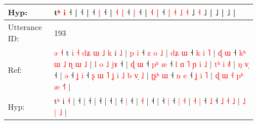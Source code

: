 \documentclass[10pt]{article}
\DeclareRobustCommand{\hl}[1]{{\textcolor{red}{#1}}}
\begin{document}
\begin{longtable}{ll}
 \\
Hyp: & \hl{}\hl{}\hl{}\hl{}\hl{}\hl{}t\hl{ʰ} \hl{i} ˧\hl{}\hl{}\hl{}\hl{}\hl{}\hl{}\hl{}\hl{}\hl{}\hl{}\hl{}\hl{}\hl{}\hl{}\hl{}\hl{}\hl{} |\hl{}\hl{}\hl{}\hl{} ˧\hl{}\hl{}\hl{}\hl{}\hl{}\hl{}\hl{}\hl{}\hl{}\hl{}\hl{}\hl{}\hl{}\hl{}\hl{}\hl{}\hl{}\hl{}\hl{}\hl{}\hl{}\hl{}\hl{}\hl{} |\hl{}\hl{} ˧\hl{}\hl{} \hl{|} ˧\hl{}\hl{}\hl{}\hl{}\hl{}\hl{} | \hl{}\hl{˧} \hl{|} ˧\hl{}\hl{} \hl{|} ˧ | \hl{}\hl{˧} \hl{|} ˧\hl{}\hl{} \hl{}\hl{}\hl{|} \hl{˧} \hl{}\hl{}\hl{˩} \hl{˧} ˩\hl{}\hl{}\hl{} \hl{˧} ˩ |\hl{}\hl{}\hl{}\hl{}\hl{} ˩\hl{} |\hl{}\hl{}\hl{}\hl{}\hl{}\hl{}\hl{}\hl{}\hl{}\hl{}\hl{}\hl{}\hl{}\hl{}\hl{}\hl{}\hl{}\hl{}\hl{}\hl{}\hl{}\hl{}\hl{}\hl{} ˩ |
 \\
\midrule
Utterance ID: & 193 \\
Ref: & \hl{ə}\hl{ }\hl{˧}\hl{ }t\hl{ }\hl{i}\hl{ }\hl{˧}\hl{ }\hl{d}\hl{ʑ}\hl{ }\hl{ɯ}\hl{ }\hl{˩}\hl{ }\hl{k} i \hl{˩} |\hl{ }\hl{p}\hl{ }\hl{i} ˧\hl{ }\hl{z}\hl{ }\hl{o}\hl{ }\hl{˩} |\hl{ }\hl{d}\hl{ʑ}\hl{ }\hl{ɯ} ˧\hl{ }\hl{k}\hl{ }\hl{i}\hl{ }\hl{˥} |\hl{ }\hl{ɖ}\hl{ }\hl{ɯ} ˧\hl{ }\hl{k}\hl{ʰ}\hl{ }\hl{ɯ}\hl{ }\hl{˩}\hl{ }\hl{ɳ}\hl{ }\hl{ɯ}\hl{ }\hl{˩} |\hl{ }\hl{l}\hl{ }\hl{o}\hl{ }\hl{˩}\hl{ }\hl{j}\hl{ɤ} ˧ |\hl{ }\hl{ɖ}\hl{ }\hl{ɯ} ˧\hl{ }\hl{p}\hl{ʰ} \hl{æ} ˧\hl{ }\hl{l}\hl{ }\hl{ɑ}\hl{ }\hl{˥}\hl{ }\hl{ɲ}\hl{ }\hl{i}\hl{ }\hl{˩} |\hl{ }\hl{t}\hl{ʰ}\hl{ }\hl{i} \hl{˩}\hl{˥} |\hl{ }\hl{ŋ}\hl{ }\hl{v}\hl{̩} ˧ |\hl{ }\hl{ə} ˧\hl{ }\hl{ʝ} \hl{i} ˧\hl{ }\hl{ʂ}\hl{ }\hl{ɯ}\hl{ }\hl{˥}\hl{ }\hl{ʝ}\hl{ }\hl{i}\hl{ }\hl{˩}\hl{ }\hl{b} \hl{v}\hl{̩} \hl{˩} | \hl{ʈ}\hl{ʂ}\hl{ʰ} \hl{ɯ} ˧\hl{ }\hl{n} \hl{e} ˧ \hl{ʝ} \hl{i} \hl{˥} |\hl{ }\hl{ɖ}\hl{ }\hl{ɯ}\hl{ }\hl{˧} \hl{p}\hl{ʰ} \hl{æ} \hl{˧}\hl{˥} |
 \\
Hyp: & \hl{}\hl{}\hl{}\hl{}t\hl{}\hl{}\hl{}\hl{}\hl{}\hl{}\hl{}\hl{}\hl{}\hl{}\hl{}\hl{}\hl{ʰ} i \hl{˧} |\hl{}\hl{}\hl{}\hl{} ˧\hl{}\hl{}\hl{}\hl{}\hl{}\hl{} |\hl{}\hl{}\hl{}\hl{}\hl{} ˧\hl{}\hl{}\hl{}\hl{}\hl{}\hl{} |\hl{}\hl{}\hl{}\hl{} ˧\hl{}\hl{}\hl{}\hl{}\hl{}\hl{}\hl{}\hl{}\hl{}\hl{}\hl{}\hl{}\hl{} |\hl{}\hl{}\hl{}\hl{}\hl{}\hl{}\hl{}\hl{}\hl{} ˧ |\hl{}\hl{}\hl{}\hl{} ˧\hl{}\hl{}\hl{} \hl{|} ˧\hl{}\hl{}\hl{}\hl{}\hl{}\hl{}\hl{}\hl{}\hl{}\hl{}\hl{}\hl{} |\hl{}\hl{}\hl{}\hl{}\hl{} \hl{}\hl{˧} |\hl{}\hl{}\hl{}\hl{}\hl{} ˧ |\hl{}\hl{} ˧\hl{}\hl{} \hl{|} ˧\hl{}\hl{}\hl{}\hl{}\hl{}\hl{}\hl{}\hl{}\hl{}\hl{}\hl{}\hl{}\hl{}\hl{} \hl{}\hl{|} \hl{˧} | \hl{}\hl{}\hl{˧} \hl{|} ˧\hl{}\hl{} \hl{˩} ˧ \hl{˩} \hl{˧} \hl{˩} |\hl{}\hl{}\hl{}\hl{}\hl{}\hl{} \hl{}\hl{˩} \hl{|} \hl{}\hl{˩} |
 \\
\midrule

\end{longtable}
\end{document}
